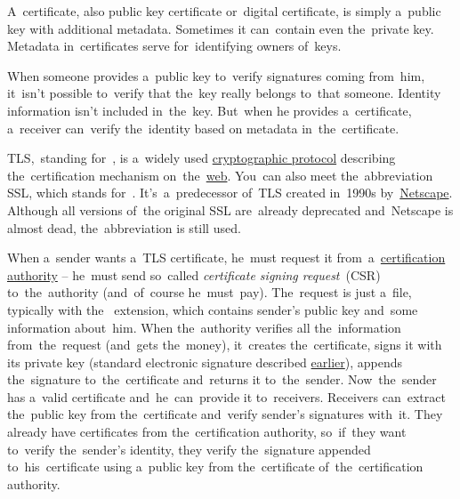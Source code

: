 \label{certificate}
A~certificate, also public key certificate or~digital certificate, is simply a~public key with additional metadata.
Sometimes it can~contain even the~private key.
Metadata in~certificates serve for~identifying owners of~keys.

When someone provides a~public key to~verify signatures coming from~him, it~isn't possible to~verify that the~key really belongs to~that someone.
Identity information isn't included in~the~key.
But~when he provides a~certificate, a~receiver can~verify the~identity based on metadata in~the~certificate.

\label{tls}
TLS,~standing for~, is a~widely used \hyperref[protocolstandard]{cryptographic protocol} describing the~certification mechanism on~the~\hyperref[internetweb]{web}.
You~can also meet the~abbreviation SSL, which stands for~.
It's~a~predecessor of~TLS created in~1990s by~\href{https://en.wikipedia.org/wiki/Netscape}{Netscape}.
Although all versions of~the original SSL are~already deprecated and~Netscape is almost dead, the~abbreviation is still used.

When a~sender wants a~TLS certificate, he~must request it from~a~\hyperref[certificationauthority]{certification authority} -- he~must send so~called \textit{certificate signing request}~(CSR) to~the~authority (and~of~course he~must~pay).
The~request is just a~file, typically with the~ extension, which contains sender's public key and~some information about~him.
When the~authority verifies all the~information from~the~request (and~gets the~money), it~creates the~certificate, signs it with its private key (standard electronic signature described \hyperref[electronicsignature]{earlier}), appends the~signature to~the~certificate and~returns it to~the~sender.
Now~the~sender has a~valid certificate and~he~can~provide it to~receivers.
Receivers can~extract the~public key from the~certificate and~verify sender's signatures with~it.
They already have certificates from the~certification authority, so~if~they want to~verify the~sender's identity, they verify the~signature appended to~his~certificate using a~public key from the~certificate of~the~certification authority.

